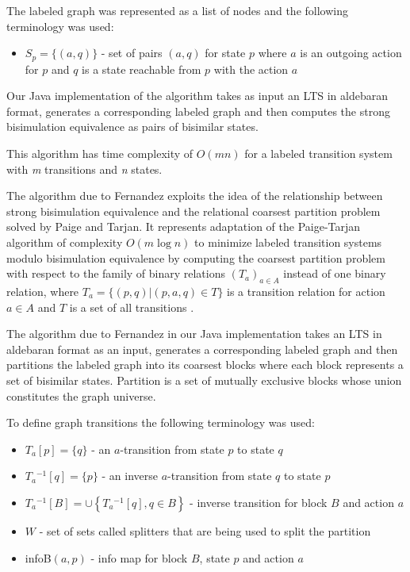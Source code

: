 The labeled graph was represented as a list of nodes and the following terminology was used:
\begin{itemize}
	\item $S_p=\{(a, q)\}$ - set of pairs $(a, q)$ for state $p$ where $a$ is an outgoing action for $p$ and $q$ is a state
	reachable from $p$ with the action $a$
\end{itemize}

Our Java implementation of the algorithm takes as input an LTS in aldebaran format, generates a corresponding labeled 
graph and then computes the strong bisimulation equivalence as pairs of bisimilar states.

This algorithm has time complexity of $O(mn)$ for a labeled transition system with \emph{m} transitions and \emph{n} 
states. 

The algorithm due to Fernandez exploits the idea of the relationship between strong bisimulation equivalence 
and the relational coarsest partition problem solved by Paige and Tarjan. It represents adaptation of the 
Paige-Tarjan algorithm of complexity $O(m \log n)$ to minimize labeled transition systems modulo bisimulation 
equivalence by computing the coarsest partition problem with respect to the family of binary relations 
$\left(T_a\right)_{a\in A}$ instead of one binary relation, where $T_a=\{(p,q)|(p,a,q)\in T\}$ is a transition 
relation for action ${a\in A}$ and $T$ is a set of all transitions \cite{PaigeTarjan, Fernandez}.

The algorithm due to Fernandez in our Java implementation takes an LTS in aldebaran format as an input, generates a 
corresponding labeled graph and then partitions the labeled graph into its coarsest blocks where each block represents 
a set of bisimilar states. Partition is a set of mutually exclusive blocks whose union constitutes the graph universe.

To define graph transitions the following terminology was used: 
\begin{itemize}
	\item $T_a[p]=\{q\}$ - an $a$-transition from state $p$ to state $q$
	\item $T_a{}^{-1}[q]=\{p\}$ - an inverse $a$-transition from state $q$ to state $p$
	\item $T_a{}^{-1}[B]=\cup \left\{T_a{}^{-1}[q],q\in B\right\}$ - inverse transition for block $B$ and action $a$
	\item $W$ - set of sets called splitters that are being used to split the partition
	\item infoB$(a, p)$ - info map for block $B$, state $p$ and action $a$
\end{itemize}

